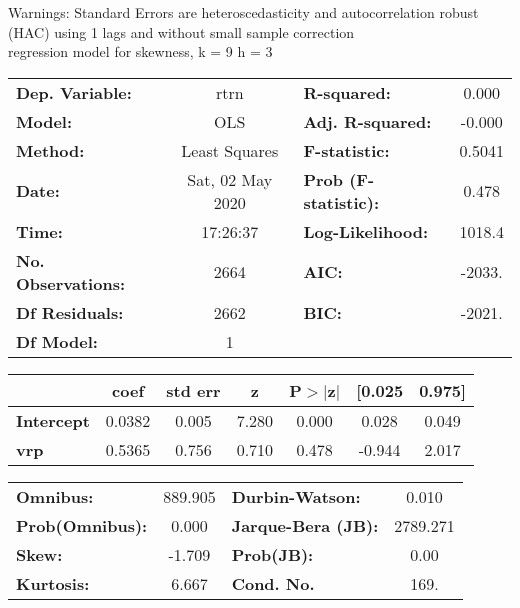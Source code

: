 Warnings: \newline
 [1] Standard Errors are heteroscedasticity and autocorrelation robust (HAC) using 1 lags and without small sample correction\\ 

regression model for skewness, k = 9 h = 3\begin{center}
\begin{tabular}{lclc}
\toprule
\textbf{Dep. Variable:}    &       rtrn       & \textbf{  R-squared:         } &     0.000   \\
\textbf{Model:}            &       OLS        & \textbf{  Adj. R-squared:    } &    -0.000   \\
\textbf{Method:}           &  Least Squares   & \textbf{  F-statistic:       } &    0.5041   \\
\textbf{Date:}             & Sat, 02 May 2020 & \textbf{  Prob (F-statistic):} &    0.478    \\
\textbf{Time:}             &     17:26:37     & \textbf{  Log-Likelihood:    } &    1018.4   \\
\textbf{No. Observations:} &        2664      & \textbf{  AIC:               } &    -2033.   \\
\textbf{Df Residuals:}     &        2662      & \textbf{  BIC:               } &    -2021.   \\
\textbf{Df Model:}         &           1      & \textbf{                     } &             \\
\bottomrule
\end{tabular}
\begin{tabular}{lcccccc}
                   & \textbf{coef} & \textbf{std err} & \textbf{z} & \textbf{P$> |$z$|$} & \textbf{[0.025} & \textbf{0.975]}  \\
\midrule
\textbf{Intercept} &       0.0382  &        0.005     &     7.280  &         0.000        &        0.028    &        0.049     \\
\textbf{vrp}       &       0.5365  &        0.756     &     0.710  &         0.478        &       -0.944    &        2.017     \\
\bottomrule
\end{tabular}
\begin{tabular}{lclc}
\textbf{Omnibus:}       & 889.905 & \textbf{  Durbin-Watson:     } &    0.010  \\
\textbf{Prob(Omnibus):} &   0.000 & \textbf{  Jarque-Bera (JB):  } & 2789.271  \\
\textbf{Skew:}          &  -1.709 & \textbf{  Prob(JB):          } &     0.00  \\
\textbf{Kurtosis:}      &   6.667 & \textbf{  Cond. No.          } &     169.  \\
\bottomrule
\end{tabular}
\end{center}

